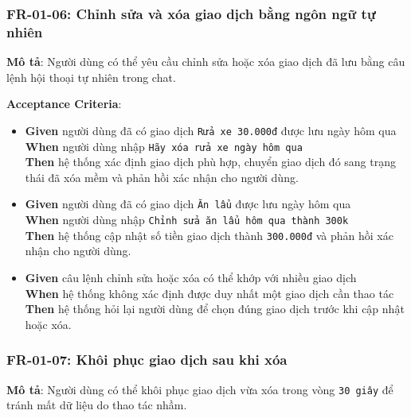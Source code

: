 \subsubsection{FR-01-06: Chỉnh sửa và xóa giao dịch bằng ngôn ngữ tự nhiên}

\textbf{Mô tả}: Người dùng có thể yêu cầu chỉnh sửa hoặc xóa giao dịch đã lưu bằng câu lệnh hội thoại tự nhiên trong chat.



\textbf{Acceptance Criteria}:

\begin{itemize}
\item \textbf{Given} người dùng đã có giao dịch \texttt{Rửa xe 30.000đ} được lưu ngày hôm qua  \\ \hspace*{1.5em}  \textbf{When} người dùng nhập \texttt{Hãy xóa rửa xe ngày hôm qua}  \\ \hspace*{1.5em}  \textbf{Then} hệ thống xác định giao dịch phù hợp, chuyển giao dịch đó sang trạng thái đã xóa mềm và phản hồi xác nhận cho người dùng.
\item \textbf{Given} người dùng đã có giao dịch \texttt{Ăn lẩu} được lưu ngày hôm qua  \\ \hspace*{1.5em}  \textbf{When} người dùng nhập \texttt{Chỉnh sửa ăn lẩu hôm qua thành 300k}  \\ \hspace*{1.5em}  \textbf{Then} hệ thống cập nhật số tiền giao dịch thành \texttt{300.000đ} và phản hồi xác nhận cho người dùng.
\item \textbf{Given} câu lệnh chỉnh sửa hoặc xóa có thể khớp với nhiều giao dịch  \\ \hspace*{1.5em}  \textbf{When} hệ thống không xác định được duy nhất một giao dịch cần thao tác  \\ \hspace*{1.5em}  \textbf{Then} hệ thống hỏi lại người dùng để chọn đúng giao dịch trước khi cập nhật hoặc xóa.
\end{itemize}
\subsubsection{FR-01-07: Khôi phục giao dịch sau khi xóa}

\textbf{Mô tả}: Người dùng có thể khôi phục giao dịch vừa xóa trong vòng \texttt{30 giây} để tránh mất dữ liệu do thao tác nhầm.




